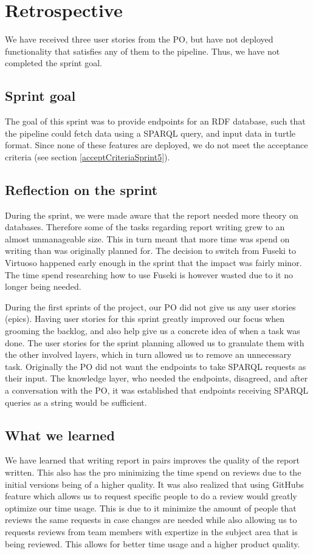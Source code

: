 \section{Retrospective}
We have received three user stories from the PO, but have not deployed functionality that satisfies any of them to the \knox{} pipeline. Thus, we have not completed the sprint goal.

\subsection{Sprint goal}
The goal of this sprint was to provide endpoints for an RDF database, such that the \knox{} pipeline could fetch data using a SPARQL query, and input data in turtle format.
Since none of these features are deployed, we do not meet the acceptance criteria (see section \ref{acceptCriteriaSprint5}).

\subsection{Reflection on the sprint}
During the sprint, we were made aware that the report needed more theory on databases. 
Therefore some of the tasks regarding report writing grew to an almost unmanageable size. This in turn meant that more time was spend on writing than was originally planned for.
The decision to switch from Fuseki to Virtuoso happened early enough in the sprint that the impact was fairly minor. The time spend researching how to use Fuseki is however wasted due to it no longer being needed.

During the first sprints of the project, our PO did not give us any user stories (epics). Having user stories for this sprint greatly improved our focus when grooming the backlog, and also help give us a concrete idea of when a task was done. 
The user stories for the sprint planning allowed us to granulate them with the other involved layers, which in turn allowed us to remove an unnecessary task. Originally the PO did not want the endpoints to take SPARQL requests as their input.
The knowledge layer, who needed the endpoints, disagreed, and after a conversation with the PO, it was established that endpoints receiving SPARQL queries as a string would be sufficient.

\subsection{What we learned}
We have learned that writing report in pairs improves the quality of the report written. This also has the pro minimizing the time spend on reviews due to the initial versions being of a higher quality.
It was also realized that using GitHubs feature which allows us to request specific people to do a review would greatly optimize our time usage. This is due to it minimize the amount of people that reviews the same requests in case changes are needed while also allowing us to requests reviews from team members with expertize in the subject area that is being reviewed. This allows for better time usage and a higher product quality. 

